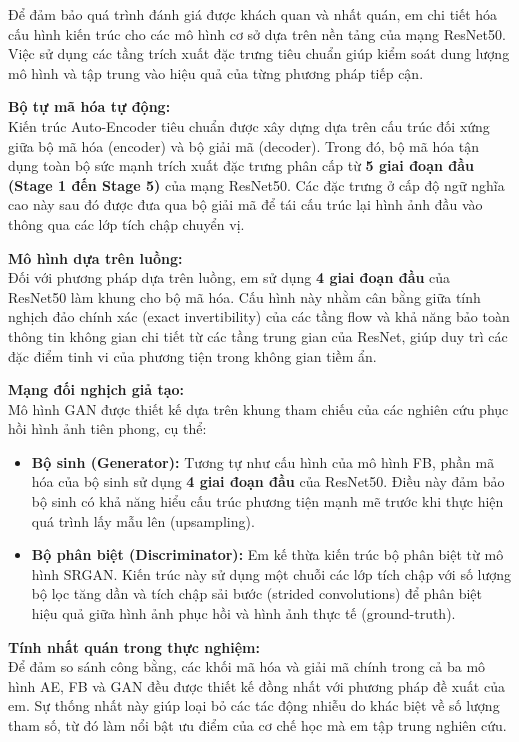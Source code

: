 Để đảm bảo quá trình đánh giá được khách quan và nhất quán, em chi tiết hóa cấu hình kiến trúc cho các mô hình cơ sở dựa trên nền tảng của mạng ResNet50. Việc sử dụng các tầng trích xuất đặc trưng tiêu chuẩn giúp kiểm soát dung lượng mô hình và tập trung vào hiệu quả của từng phương pháp tiếp cận.

\textbf{Bộ tự mã hóa tự động:}\\
\label{subsec:ae_config}
Kiến trúc Auto-Encoder tiêu chuẩn được xây dựng dựa trên cấu trúc đối xứng giữa bộ mã hóa (encoder) và bộ giải mã (decoder). Trong đó, bộ mã hóa tận dụng toàn bộ sức mạnh trích xuất đặc trưng phân cấp từ \textbf{5 giai đoạn đầu (Stage 1 đến Stage 5)} của mạng ResNet50. Các đặc trưng ở cấp độ ngữ nghĩa cao này sau đó được đưa qua bộ giải mã để tái cấu trúc lại hình ảnh đầu vào thông qua các lớp tích chập chuyển vị.

\textbf{Mô hình dựa trên luồng:}\\
\label{subsec:fb_config}
Đối với phương pháp dựa trên luồng, em sử dụng \textbf{4 giai đoạn đầu} của ResNet50 làm khung cho bộ mã hóa. Cấu hình này nhằm cân bằng giữa tính nghịch đảo chính xác (exact invertibility) của các tầng flow và khả năng bảo toàn thông tin không gian chi tiết từ các tầng trung gian của ResNet, giúp duy trì các đặc điểm tinh vi của phương tiện trong không gian tiềm ẩn.

\textbf{Mạng đối nghịch giả tạo:}\\
\label{subsec:gan_config}
Mô hình GAN được thiết kế dựa trên khung tham chiếu của các nghiên cứu phục hồi hình ảnh tiên phong, cụ thể:
\begin{itemize}
    \item \textbf{Bộ sinh (Generator):} Tương tự như cấu hình của mô hình FB, phần mã hóa của bộ sinh sử dụng \textbf{4 giai đoạn đầu} của ResNet50. Điều này đảm bảo bộ sinh có khả năng hiểu cấu trúc phương tiện mạnh mẽ trước khi thực hiện quá trình lấy mẫu lên (upsampling).
    \item \textbf{Bộ phân biệt (Discriminator):} Em kế thừa kiến trúc bộ phân biệt từ mô hình SRGAN. Kiến trúc này sử dụng một chuỗi các lớp tích chập với số lượng bộ lọc tăng dần và tích chập sải bước (strided convolutions) để phân biệt hiệu quả giữa hình ảnh phục hồi và hình ảnh thực tế (ground-truth).
\end{itemize}

\textbf{Tính nhất quán trong thực nghiệm:}\\
Để đảm so sánh công bằng, các khối mã hóa và giải mã chính trong cả ba mô hình AE, FB và GAN đều được thiết kế đồng nhất với phương pháp đề xuất của em. Sự thống nhất này giúp loại bỏ các tác động nhiễu do khác biệt về số lượng tham số, từ đó làm nổi bật ưu điểm của cơ chế học mà em tập trung nghiên cứu.

